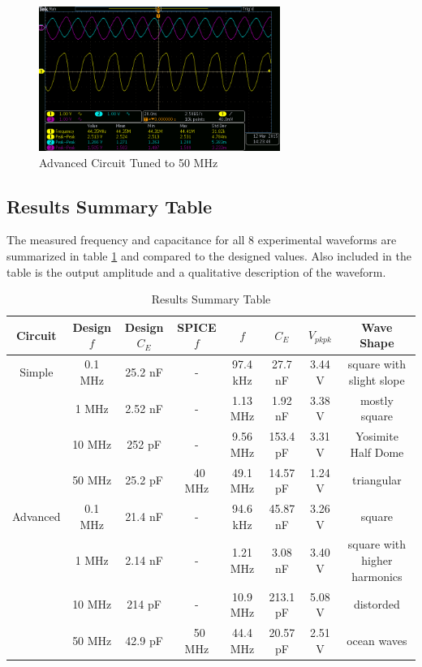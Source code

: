 \documentclass[titlepage, letterpaper, 10.5pt]{article}
\begin{document}
\begin{figure}[ht]
	\centering
	\includegraphics[width=0.7\textwidth]{results/advanced-50MHz}
	\caption{Advanced Circuit Tuned to 50 MHz}
	\label{advanced-50MHz}
\end{figure}

\clearpage
\subsection{Results Summary Table}

The measured frequency and capacitance for all 8 experimental waveforms are
summarized in table \ref{results-summary-table} and compared to the designed values.
Also included in the table is the output amplitude and a qualitative description of the waveform.

\begin{table}[ht]
\centering
\caption{Results Summary Table}
\begin{tabular}{c | c | c | c | c | c | c | c}
\hline\hline
Circuit	&Design $f$	&Design $C_{E}$	&SPICE $f$	&$f$		&$C_{E}$	&$V_{pkpk}$	&Wave Shape	\\
\hline\hline
Simple	&0.1 MHz	&25.2 nF		&-			&97.4 kHz	&27.7 nF	&3.44 V		&square with slight slope\\
		&1 MHz		&2.52 nF		&-			&1.13 MHz	&1.92 nF	&3.38 V		&mostly square	\\
		&10 MHz		&252 pF			&-			&9.56 MHz	&153.4 pF	&3.31 V		&Yosimite Half Dome	\\
		&50 MHz		&25.2 pF		&~40 MHz	&49.1 MHz	&14.57 pF	&1.24 V		&triangular	\\
\hline
Advanced&0.1 MHz	&21.4 nF		&-			&94.6 kHz	&45.87 nF	&3.26 V		&square	\\
		&1 MHz		&2.14 nF		&-			&1.21 MHz	&3.08 nF	&3.40 V		&square with higher harmonics	\\
		&10 MHz		&214 pF			&-			&10.9 MHz	&213.1 pF	&5.08 V		&distorded	\\
		&50 MHz		&42.9 pF		&~50 MHz	&44.4 MHz	&20.57 pF	&2.51 V		&ocean waves	\\
\hline\hline
\end{tabular}
\label{results-summary-table}
\end{table}
\end{document}
